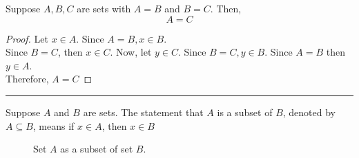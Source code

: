 \documentclass{article}
\def \proofDistance {5pt}
\def \subheaderSpace {10pt}
\newcommand{\proofseparator}{\par\noindent\rule{\textwidth}{0.4pt}}
\newcommand{\pf}[1]{
    \vspace{\proofDistance}
    \begin{proof}
    #1
    \end{proof}
    \proofseparator
}
\begin{document}
        \vspace{\subheaderSpace}

\setcounter{theorem}{1}

        \begin{theorem}
            Suppose $A,B,C$ are sets with $A=B$ and $B=C$. Then, $$A = C$$
        \end{theorem}

        \pf{
            Let $x\in A$. Since $A = B, x\in B$. \\
            \indent Since $B=C$, then $x\in C$. Now, let $y\in C$. Since $B=C, y\in B$. Since $A=B$ then $y\in A$. \\
            \indent Therefore, $A=C$
        }

        \vspace{\subheaderSpace}

        \begin{definition}
            Suppose $A$ and $B$ are sets. The statement that $A$ is a subset of $B$, denoted by $A\subseteq B$, means if $x\in A$, then $x\in B$
        \end{definition}

        \begin{figure}[htbp]
            \centering
            \caption{Set \( A \) as a subset of set \( B \).}
        \end{figure}
\end{document}
